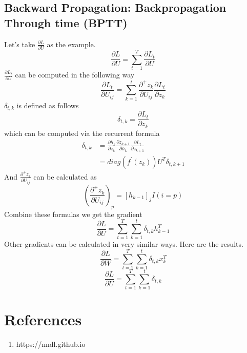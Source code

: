 \documentclass[11pt,a4paper]{article}
\begin{document}
\subsection{Backward Propagation: Backpropagation Through time (BPTT)}
Let's take $\frac{\partial L}{\partial U}$ as the example.
\begin{displaymath}
\frac{\partial L}{\partial U} = \sum^{T}_{t=1}\frac{\partial L_{t}}{\partial U}
\end{displaymath}
$\frac{\partial L_{t}}{\partial U}$ can be computed in the following way
\begin{displaymath}
\frac{\partial L_{t}}{\partial U_{ij}} = \sum^{t}_{k = 1}\frac{\partial^{+} z_{k}}{\partial U_{ij}}\frac{\partial L_{t}}{\partial z_{k}}
\end{displaymath}
$\delta_{t,k}$ is defined as follows
\begin{displaymath}
\delta_{t,k} = \frac{\partial L_{t}}{\partial z_{k}}
\end{displaymath}
which can be computed via the recurrent formula
\begin{align*}
\delta_{t,k} &= \frac{\partial h_{k}}{\partial z_{k}} \frac{\partial z_{k+1}}{\partial h_{k}} \frac{\partial L_{t}}{\partial z_{k+1}}\\
&=diag(f^{'}(z_{k}))U^{T}\delta_{t,k+1}
\end{align*}
And $\frac{\partial^{+} z_{k}}{\partial U_{ij}}$ can be calculated as
\begin{displaymath}
(\frac{\partial^{+} z_{k}}{\partial U_{ij}})_{p} = [h_{k-1}]_{j} I(i=p)
\end{displaymath}
Combine these formulas we get the gradient
\begin{displaymath}
\frac{\partial L}{\partial U} = \sum^{T}_{t=1} \sum^{t}_{k=1} \delta_{t,k} h^{T}_{k-1}
\end{displaymath}
Other gradients can be calculated in very similar ways. Here are the results.
\begin{displaymath}
\frac{\partial L}{\partial W} = \sum^{T}_{t=1} \sum^{t}_{k=1} \delta_{t,k} x^{T}_{k}
\end{displaymath}
\begin{displaymath}
\frac{\partial L}{\partial U} = \sum^{T}_{t=1} \sum^{t}_{k=1} \delta_{t,k}
\end{displaymath}
\section{References}
\begin{enumerate}
\item https://nndl.github.io
\end{enumerate}
\end{document}
